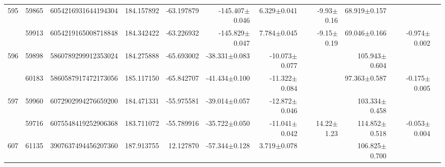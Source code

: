 \documentclass{ws-ijmpd}
\begin{document}
\begin{landscape}
\begin{longtable}{rrrrrrrrrrl}
 \hline 595 &   59865 &      6054216931644194304 &                   184.157892 &                   -63.197879 &               -145.407$\pm$0.046 &                  6.329$\pm$0.041 &          -9.93$\pm$  0.16 &        68.919$\pm$0.157 &                                           &                                                    \\
            &   59913 &      6054219165008718848 &                   184.342422 &                   -63.226932 &               -145.829$\pm$0.047 &                  7.784$\pm$0.045 &          -9.15$\pm$  0.19 &        69.046$\pm$0.166 &                          -0.974$\pm$0.002 &                                                    \\
 \hline 596 &   59898 &      5860789299912353024 &                   184.275888 &                   -65.693002 &                -38.331$\pm$0.083 &                -10.073$\pm$0.077 &                           &       105.943$\pm$0.604 &                                           &                                                    \\
            &   60183 &      5860587917472173056 &                   185.117150 &                   -65.842707 &                -41.434$\pm$0.100 &                -11.322$\pm$0.084 &                           &        97.363$\pm$0.587 &                          -0.175$\pm$0.005 &                                                    \\
 \hline 597 &   59960 &      6072902994276659200 &                   184.471331 &                   -55.975581 &                -39.014$\pm$0.057 &                -12.872$\pm$0.046 &                           &       103.334$\pm$0.458 &                                           &                                                    \\
            &   59716 &      6075548419252906368 &                   183.711072 &                   -55.789916 &                -35.722$\pm$0.050 &                -11.041$\pm$0.042 &          14.22$\pm$  1.23 &       114.852$\pm$0.518 &                          -0.053$\pm$0.004 &                                                    \\
 \hline 607 &   61135 &      3907637494456207360 &                   187.913755 &                    12.127870 &                -57.344$\pm$0.128 &                  3.719$\pm$0.078 &                           &       106.825$\pm$0.700 &                                           &                                                    \\

\end{longtable}
\end{landscape}
\end{document}
